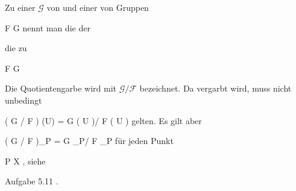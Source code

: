 

{}
{





Zu einer
${ \mathcal  G   }$ von
und einer
von Gruppen

\mavergleichskette
{\vergleichskette
{ { \mathcal  F   }
}
{ \subseteq }{ { \mathcal  G   }
}
{  }{
}
{    }{
}
{   }{
}
}
{}{}{}
nennt man die
der

 die
zu

\mavergleichskette
{\vergleichskette
{ { \mathcal  F   }
}
{ \subseteq }{ { \mathcal  G   }
}
{  }{
}
{    }{
}
{   }{
}
}
{}{}{}





}

Die Quotientengarbe wird mit ${ \mathcal G  }/ { \mathcal F  }$ bezeichnet. Da vergarbt wird, muss nicht unbedingt

\mavergleichskette
{\vergleichskette
{ \left(  { \mathcal G  }/ { \mathcal F  }  \right) (U)
}
{ = }{ { \mathcal G  }  \left(  U   \right)/ { \mathcal F  }  \left(  U   \right)
}
{  }{
}
{    }{
}
{   }{
}
}
{}{}{}
gelten. Es gilt aber

\mavergleichskette
{\vergleichskette
{ \left(  { \mathcal G  }/ { \mathcal F  }  \right)_P
}
{ = }{ { \mathcal G  }_P/ { \mathcal F  }_P
}
{  }{
}
{    }{
}
{   }{
}
}
{}{}{}
für jeden Punkt

\mavergleichskette
{\vergleichskette
{P
}
{ \in }{X
}
{  }{
}
{    }{
}
{   }{
}
}
{}{}{,}
siehe

Aufgabe 5.11
.





